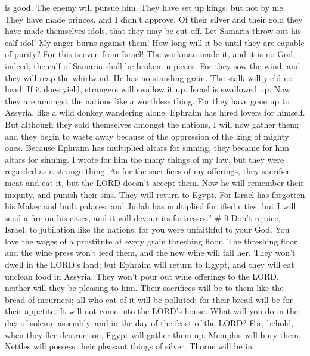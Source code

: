 is good. The enemy will pursue him.  They have set up
kings, but not by me. They have made princes, and I didn't approve. Of
their silver and their gold they have made themselves idols, that they
may be cut off.  Let Samaria throw out his calf idol! My
anger burns against them! How long will it be until they are capable of
purity?  For this is even from Israel! The workman made
it, and it is no God; indeed, the calf of Samaria shall be broken in
pieces.  For they sow the wind, and they will reap the
whirlwind. He has no standing grain. The stalk will yield no head. If it
does yield, strangers will swallow it up.  Israel is
swallowed up. Now they are amongst the nations like a worthless thing.
 For they have gone up to Assyria, like a wild donkey
wandering alone. Ephraim has hired lovers for himself. 
But although they sold themselves amongst the nations, I will now gather
them; and they begin to waste away because of the oppression of the king
of mighty ones.  Because Ephraim has multiplied altars
for sinning, they became for him altars for sinning.  I
wrote for him the many things of my law, but they were regarded as a
strange thing.  As for the sacrifices of my offerings,
they sacrifice meat and eat it, but the LORD doesn't accept them. Now he
will remember their iniquity, and punish their sins. They will return to
Egypt.  For Israel has forgotten his Maker and built
palaces; and Judah has multiplied fortified cities; but I will send a
fire on his cities, and it will devour its fortresses.'' \# 9
 Don't rejoice, Israel, to jubilation like the nations;
for you were unfaithful to your God. You love the wages of a prostitute
at every grain threshing floor.  The threshing floor and
the wine press won't feed them, and the new wine will fail her.
 They won't dwell in the LORD's land; but Ephraim will
return to Egypt, and they will eat unclean food in Assyria.
 They won't pour out wine offerings to the LORD, neither
will they be pleasing to him. Their sacrifices will be to them like the
bread of mourners; all who eat of it will be polluted; for their bread
will be for their appetite. It will not come into the LORD's house.
 What will you do in the day of solemn assembly, and in
the day of the feast of the LORD?  For, behold, when they
flee destruction, Egypt will gather them up. Memphis will bury them.
Nettles will possess their pleasant things of silver. Thorns will be in
